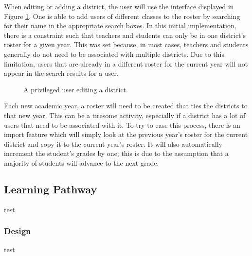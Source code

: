 When editing or adding a district, the user will use the interface displayed in Figure \ref{fig:screens-district-edit}. One is able to add users of different classes to the roster by searching for their name in the appropriate search boxes. In this initial implementation, there is a constraint such that teachers and students can only be in one district's roster for a given year. This was set because, in most cases, teachers and students generally do not need to be associated with multiple districts. Due to this limitation, users that are already in a different roster for the current year will not appear in the search results for a user.

\begin{figure}[h!]
	\centering
	\caption{A privileged user editing a district.}
	\label{fig:screens-district-edit}
\end{figure}

Each new academic year, a roster will need to be created that ties the districts to that new year. This can be a tiresome activity, especially if a district has a lot of users that need to be associated with it. To try to ease this process, there is an import feature which will simply look at the previous year's roster for the current district and copy it to the current year's roster. It will also automatically increment the student's grades by one; this is due to the assumption that a majority of students will advance to the next grade.

\subsection{Learning Pathway}
\label{subsec:design-pathway}
test

\subsubsection{Design}
test

